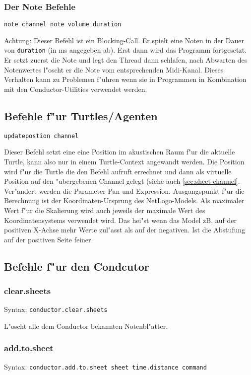 \subsubsection{Der Note Befehle}
\lstinline|note channel note volume duration| \label{note-warning}


\begin{emph}Achtung: Dieser
Befehl ist ein Blocking-Call. Er spielt eine Noten in der Dauer von 
\lstinline|duration| (in ms angegeben ab). Erst dann wird das Programm fortgesetzt.
Er setzt zuerst die Note und legt den Thread dann schlafen, nach Abwarten des
Notenwertes l"oscht er die Note vom entsprechenden Midi-Kanal. Dieses Verhalten
kann zu Problemen f"uhren wenn sie in Programmen in Kombination mit den 
Conductor-Utilities verwendet werden. \end{emph}
\subsection{Befehle f"ur Turtles/Agenten}
\lstinline|updatepostion channel| 

Dieser Befehl setzt eine eine Position im akustischen Raum f"ur die aktuelle
Turtle, kann also nur in einem Turtle-Context angewandt werden. Die Position
wird f"ur die Turtle die den Befehl aufruft errechnet und dann als virtuelle
Position auf den "ubergebenen Channel gelegt (siehe auch \ref{sec:sheet-channel}. 
Ver"andert werden die Parameter Pan und Expression. Ausgangspunkt f"ur die
Berechnung ist der Koordinaten-Ursprung des NetLogo-Models. Als maximaler Wert
f"ur die Skalierung wird auch jeweils der maximale Wert des Koordinatensystems
verwendet wird. Das hei"st wenn das Model zB. auf der positiven X-Achse mehr Werte
zul"asst als auf der negativen. Ist die Abstufung auf der positiven Seite feiner.

\subsection{Befehle f"ur den Condcutor}
\subsubsection{clear.sheets}
Syntax: \lstinline|conductor.clear.sheets|

L"oscht alle dem Conductor bekannten Notenbl"atter.
\subsubsection{add.to.sheet}
Syntax: \lstinline|conductor.add.to.sheet sheet time.distance command|

